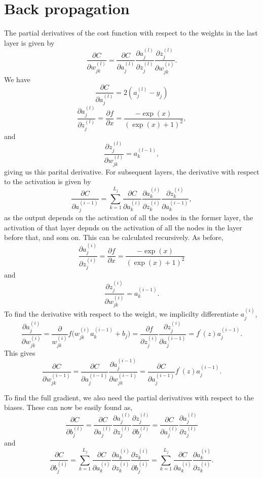 \section*{Back propagation}
The partial derivatives of the cost function with respect to the weights in the last layer is given by
$$
    \frac{\partial C}{\partial w^{(l)}_{jk}} = \frac{\partial C}{\partial a^{(l)}_{j}} 
    \frac{\partial a^{(l)}_{j}}{\partial z^{(l)}_{j}} \frac{\partial z^{(l)}_{j}}{\partial w^{(i)}_{jk}}.
$$
We have
$$
    \frac{\partial C}{\partial a^{(l)}_{j}} = 2(a^{(l)}_{j} - y_j) 
$$
$$
    \frac{\partial a^{(l)}_{j}}{\partial z^{(l)}_{j}} = \frac{\partial f}{\partial x} = \frac{-\exp(x)}{(\exp(x) + 1)^2},
$$
and
$$
\frac{\partial z^{(l)}_{j}}{\partial w^{(l)}_{jk}} = a^{(l - 1)}_k,
$$
giving us this parital derivative. For subsequent layers, the derivative with respect to the activation is given by
$$
    \frac{\partial C}{\partial a^{(i - 1)}_{j}} = \sum_{k = 1}^{L_j}\frac{\partial C}{\partial a^{(i)}_{k}} 
    \frac{\partial a^{(i)}_{k}}{\partial z^{(i)}_{k}} \frac{\partial z^{(i)}_{k}}{\partial a^{(i -1)}_{k}},
$$
as the output depends on the activation of all the nodes in the former layer, the activation of that layer depnds on the activation of all the nodes in the layer before that, and som on. 
This can be calculated recursively. As before,
$$
    \frac{\partial a^{(i)}_{j}}{\partial z^{(i)}_{j}} = \frac{\partial f}{\partial x} = \frac{-\exp(x)}{(\exp(x) + 1)^2}
$$
and
$$
    \frac{\partial z^{(i)}_{j}}{\partial w^{(i)}_{jk}} = a^{(i - 1)}_k.
$$
To find the derivative with respect to the weight, we implicilty differentiate $a^{(i)}_{j}$,
$$ 
    \frac{\partial a^{(i)}_{j}}{\partial w^{(i)}_{jk}} = \frac{\partial}{w^{(i)}_{jk}}f\big(w^{(i)}_{jk} a^{(i-1)}_k + b_j \big) = \frac{\partial f}{ \partial z^{(i)}_{j}} \frac{\partial z^{(i)}_{j}}{ \partial a^{(i-1)}_{j}} = f^\prime (z)a^{(i-1)}_{j}.
$$
This gives
$$
    \frac{\partial C}{\partial w^{(i - 1)}_{jk}} = \frac{\partial C}{\partial a^{(i - 1)}_{j}} \frac{\partial a^{(i - 1)}_{j}}{\partial w^{(i - 1)}_{jk}} = \frac{\partial C}{\partial a^{(i - 1)}_{j}} f^\prime (z)a^{(i-1)}_{j}.
$$

To find the full gradient, we also need the partial derivatives with respect to the biases. These can now be easily found as,
$$
    \frac{\partial C}{\partial b^{(l)}_{j}} = \frac{\partial C}{\partial a^{(l)}_{j}} 
    \frac{\partial a^{(l)}_{j}}{\partial z^{(l)}_{j}} \frac{\partial z^{(l)}_{j}}{\partial b^{(l)}_{j}} = \frac{\partial C}{\partial a^{(l)}_{j}} \frac{\partial a^{(l)}_{j}}{\partial z^{(l)}_{j}}
$$
and
$$
    \frac{\partial C}{\partial b^{(i)}_{j}} = \sum_{k = 1}^{L_j}\frac{\partial C}{\partial a^{(i)}_{k}} 
    \frac{\partial a^{(i)}_{k}}{\partial z^{(i)}_{k}} \frac{\partial z^{(i)}_{k}}{\partial b^{(i)}_{j}} = \sum_{k = 1}^{L_j}\frac{\partial C}{\partial a^{(i)}_{k}}
    \frac{\partial a^{(i)}_{k}}{\partial z^{(i)}_{k}}.
$$

